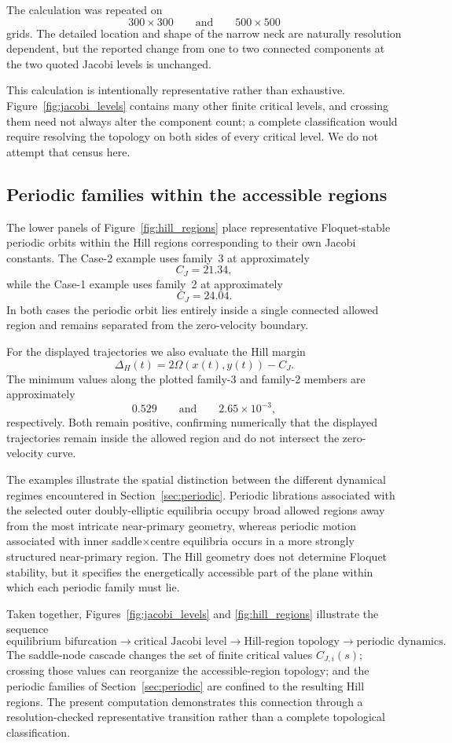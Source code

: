 The calculation was repeated on
\[
300\times300
\qquad\text{and}\qquad
500\times500
\]
grids. The detailed location and shape of the narrow neck are naturally
resolution dependent, but the reported change from one to two connected
components at the two quoted Jacobi levels is unchanged.

This calculation is intentionally representative rather than exhaustive.
Figure~\ref{fig:jacobi_levels} contains many other finite critical levels,
and crossing them need not always alter the component count; a complete
classification would require resolving the topology on both sides of every
critical level. We do not attempt that census here.


\subsection{Periodic families within the accessible regions}
\label{subsec:hill_orbits}

The lower panels of Figure~\ref{fig:hill_regions} place representative
Floquet-stable periodic orbits within the Hill regions corresponding to
their own Jacobi constants. The Case-2 example uses family~3 at
approximately
\[
C_J=21.34,
\]
while the Case-1 example uses family~2 at approximately
\[
C_J=24.04.
\]
In both cases the periodic orbit lies entirely inside a single connected
allowed region and remains separated from the zero-velocity boundary.

For the displayed trajectories we also evaluate the Hill margin
\[
\Delta_H(t)=2\Omega(x(t),y(t))-C_J.
\]
The minimum values along the plotted family-3 and family-2 members are
approximately
\[
0.529
\qquad\text{and}\qquad
2.65\times10^{-3},
\]
respectively. Both remain positive, confirming numerically that the
displayed trajectories remain inside the allowed region and do not
intersect the zero-velocity curve.

The examples illustrate the spatial distinction between the different
dynamical regimes encountered in Section~\ref{sec:periodic}. Periodic
librations associated with the selected outer doubly-elliptic equilibria
occupy broad allowed regions away from the most intricate near-primary
geometry, whereas periodic motion associated with inner
saddle$\times$centre equilibria occurs in a more strongly structured
near-primary region. The Hill geometry does not determine Floquet
stability, but it specifies the energetically accessible part of the plane
within which each periodic family must lie.

Taken together, Figures~\ref{fig:jacobi_levels} and
\ref{fig:hill_regions} illustrate the sequence
\[
\text{equilibrium bifurcation}
\longrightarrow
\text{critical Jacobi level}
\longrightarrow
\text{Hill-region topology}
\longrightarrow
\text{periodic dynamics}.
\]
The saddle-node cascade changes the set of finite critical values
$C_{J,i}(s)$; crossing those values can reorganize the accessible-region
topology; and the periodic families of Section~\ref{sec:periodic} are
confined to the resulting Hill regions. The present computation
demonstrates this connection through a resolution-checked representative
transition rather than a complete topological classification.

